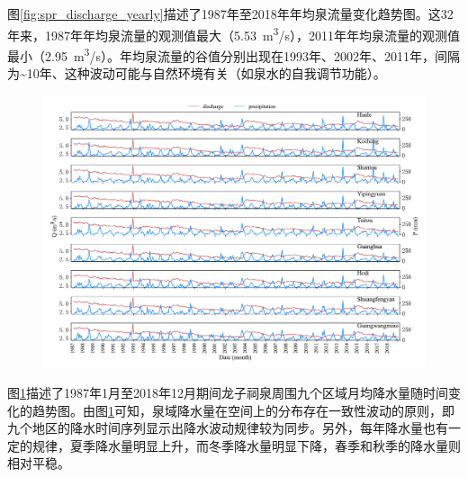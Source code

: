 图\ref{fig:spr_discharge_yearly}描述了1987年至2018年年均泉流量变化趋势图。这32年来，1987年年均泉流量的观测值最大（\SI{5.53}{m^{3}/s}），2011年年均泉流量的观测值最小（\SI{2.95}{m^{3}/s}）。年均泉流量的谷值分别出现在1993年、2002年、2011年，间隔为\sim 10年、这种波动可能与自然环境有关（如泉水的自我调节功能）。

\begin{figure}[!htbp]
  \vspace{-0.35cm}
  \centering
  \includegraphics[width=\textwidth]{Img/chap4_spr/spr_precipitation_monthly}
  \vspace{-1cm}
  \label{fig:spr_precipitation_monthly}
\end{figure}

图\ref{fig:spr_precipitation_monthly}描述了1987年1月至2018年12月期间龙子祠泉周围九个区域月均降水量随时间变化的趋势图。由图\ref{fig:spr_precipitation_monthly}可知，泉域降水量在空间上的分布存在一致性波动的原则，即九个地区的降水时间序列显示出降水波动规律较为同步。另外，每年降水量也有一定的规律，夏季降水量明显上升，而冬季降水量明显下降，春季和秋季的降水量则相对平稳。

